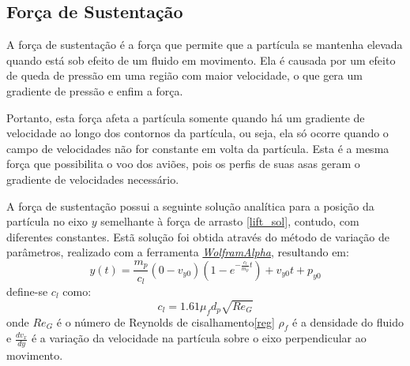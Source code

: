\subsection{\textbf{Força de Sustentação}}
\label{sec_lift}
A força de sustentação é a força que permite que a partícula se mantenha elevada quando está sob efeito de um fluido em movimento.
Ela é causada por um efeito de queda de pressão em uma região com maior velocidade, o que gera um gradiente de pressão e enfim a força.

Portanto, esta força afeta a partícula somente quando há um gradiente de velocidade ao longo dos contornos da partícula, ou seja, ela só ocorre quando o campo de velocidades não for constante em volta da partícula.
Esta é a mesma força que possibilita o voo dos aviões, pois os perfis de suas asas geram o gradiente de velocidades necessário.

A força de sustentação possui a seguinte solução analítica para a posição da partícula no eixo $y$ semelhante à força de arrasto \eqref{lift_sol}, contudo, com diferentes constantes.
Estã solução foi obtida através do método de variação de parâmetros, realizado com a ferramenta \href{https://www.wolframalpha.com}{\textit{WolframAlpha}}, resultando em:
\begin{equation}
    y(t) = \dfrac{m_p}{c_l} (0 - v_{y0}) \left(1 - e^{-\frac{c_l}{m_p}t}\right) + v_{y0}t + p_{y0}
    \label{lift_sol} 
\end{equation}
define-se $c_l$ como:
\begin{equation}
    c_l = 1.61 \mu_f d_p \sqrt{{Re}_G}
    \label{lift_c} 
\end{equation}
onde $Re_G$ é o número de Reynolds de cisalhamento\eqref{reg} $\rho_f$ é a densidade do fluido e $\tfrac{dv_x}{dy}$ é a variação da velocidade na partícula sobre o eixo perpendicular ao movimento.

